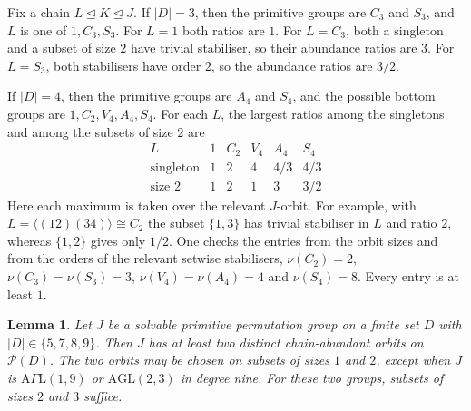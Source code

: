 \documentclass[10pt]{amsart}
\newtheorem{lemma}[theorem]{Lemma}
\theoremstyle{definition}
\let\oldendproof\endproof
\renewenvironment{proof}[1][\proofname]{%
  \oldproof[\bfseries #1]%
}{\oldendproof}
\newcommand{\pow}{\mathcal{P}}
\numberwithin{equation}{section}
\numberwithin{table}{section}
\begin{document}
\begin{proof}
Fix a chain $L\trianglelefteq K\trianglelefteq J$. If $|D|=3$, then the primitive
groups are $C_3$ and $S_3$, and $L$ is one of $1,C_3,S_3$. For $L=1$ both
ratios are $1$. For $L=C_3$, both a singleton and a subset of size $2$ have
trivial stabiliser, so their abundance ratios are $3$. For $L=S_3$, both
stabilisers have order $2$, so the abundance ratios are $3/2$.

If $|D|=4$, then the primitive groups are $A_4$ and $S_4$, and the possible
bottom groups are
$1,C_2,V_4,A_4,S_4$. For each $L$, the largest ratios
among the singletons and among the subsets of size $2$ are
$$
\renewcommand{\arraystretch}{1.15}
\begin{array}{c|ccccc}
 L & 1 & C_2 & V_4 & A_4 & S_4\\\hline
 \text{singleton} & 1 & 2 & 4 & 4/3 & 4/3\\
 \text{size }2    & 1 & 2 & 1 & 3 & 3/2
\end{array}
$$
Here each maximum is taken over the relevant $J$-orbit. For example, with
$L=\langle(12)(34)\rangle\cong C_2$ the subset $\{1,3\}$ has trivial
stabiliser in $L$ and ratio $2$, whereas $\{1,2\}$ gives only $1/2$. One checks the
entries from the orbit sizes and from the orders of the relevant setwise stabilisers,
$\nu(C_2)=2$, $\nu(C_3)=\nu(S_3)=3$, $\nu(V_4)=\nu(A_4)=4$ and
$\nu(S_4)=8$. Every entry is at least $1$.
\end{proof}

\begin{lemma}\label{lem:deg5789}
Let $J$ be a solvable primitive permutation group on a finite set $D$ with
$|D|\in\{5,7,8,9\}$. Then $J$ has at least two distinct chain-abundant
orbits on $\pow(D)$. The two orbits may be chosen on subsets of sizes $1$ and
$2$, except when $J$ is $\mathrm{A}\Gamma\mathrm{L}(1,9)$ or $\mathrm{AGL}(2,3)$
in degree nine. For these two groups, subsets of sizes $2$ and $3$ suffice.
\end{lemma}
\end{document}
